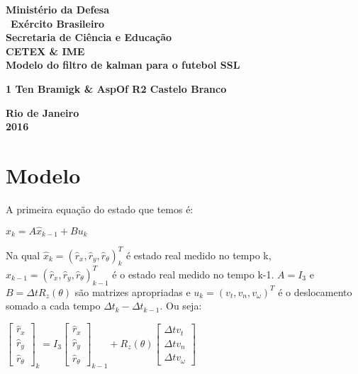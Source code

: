\documentclass[12 pt]{article}
\begin{document}
\begin{titlepage}

\begin{center}
\textbf{\Large Ministério da Defesa}\\\
\textbf{\Large Exército Brasileiro}\\
\textbf{\Large Secretaria de Ciência e Educação}\\
\textbf{\Large CETEX \& IME }\\\vfill
\textbf{\huge Modelo do filtro de kalman para o futebol SSL}\\[2cm]%
\end{center}
\begin{center}
\textbf{\Large 1 Ten Bramigk \& AspOf R2 Castelo Branco}\\\vfill

\textbf{\large Rio de Janeiro}\\
\textbf{\large 2016}
\end{center}
\end{titlepage}

\section{Modelo}

A primeira equação do estado que temos é:

\begin{center}
$\hat{x}_{k} = A \hat{x}_{k-1} + B u_{k}$
\end{center}

Na qual $\hat{x}_{k} = (\hat{r}_{x}, \hat{r}_{y}, \hat{r}_{\theta})^{T}_{k}$ é  estado real medido no tempo k,  $\hat{x}_{k-1} = (\hat{r}_{x}, \hat{r}_{y}, \hat{r}_{\theta})^{T}_{k-1}$ é o estado real medido no tempo k-1. $A = I_{3}$ e $B = \Delta tR_{z}(\theta)$ são matrizes apropriadas e ${u}_{k} = (v_{t}, v_{n}, v_{\omega})^{T}$ é o deslocamento somado a cada tempo $\Delta t_{k} - \Delta t_{k-1}$. Ou seja:
\begin{center}
$\begin{bmatrix}
  \hat{r}_{x}\\        
  \hat{r}_{y}\\[0.3em]
  \hat{r}_{\theta} 
 \end{bmatrix}_{k}
 = I_{3}\begin{bmatrix}
  \hat{r}_{x}\\        
  \hat{r}_{y}\\[0.3em]
  \hat{r}_{\theta} 
 \end{bmatrix}_{k-1}
 + R_{z}(\theta)\begin{bmatrix}
  \Delta t v_{t}\\        
  \Delta t v_{n}\\[0.3em]
  \Delta t v_{\omega} 
 \end{bmatrix}$
\end{center}
\end{document}
